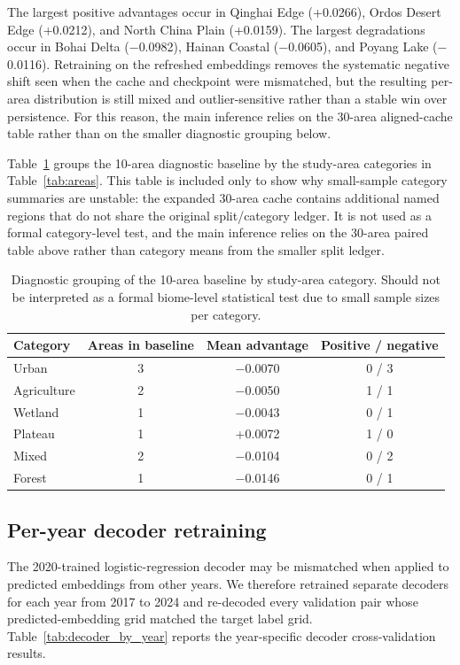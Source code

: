 \documentclass{article}
\begin{document}
The largest positive advantages occur in Qinghai Edge (+0.0266), Ordos Desert Edge (+0.0212), and North China Plain (+0.0159). The largest degradations occur in Bohai Delta ($-$0.0982), Hainan Coastal ($-$0.0605), and Poyang Lake ($-$0.0116). Retraining on the refreshed embeddings removes the systematic negative shift seen when the cache and checkpoint were mismatched, but the resulting per-area distribution is still mixed and outlier-sensitive rather than a stable win over persistence. For this reason, the main inference relies on the 30-area aligned-cache table rather than on the smaller diagnostic grouping below.


Table~\ref{tab:category_diagnostic} groups the 10-area diagnostic baseline by the study-area categories in Table~\ref{tab:areas}. This table is included only to show why small-sample category summaries are unstable: the expanded 30-area cache contains additional named regions that do not share the original split/category ledger. It is not used as a formal category-level test, and the main inference relies on the 30-area paired table above rather than category means from the smaller split ledger.

\begin{table}[htbp]
\centering
\caption{Diagnostic grouping of the 10-area baseline by study-area category. Should not be interpreted as a formal biome-level statistical test due to small sample sizes per category.}
\label{tab:category_diagnostic}
\small
\begin{tabular}{lccc}
\toprule
Category & Areas in baseline & Mean advantage & Positive / negative \\
\midrule
Urban & 3 & $-$0.0070 & 0 / 3 \\
Agriculture & 2 & $-$0.0050 & 1 / 1 \\
Wetland & 1 & $-$0.0043 & 0 / 1 \\
Plateau & 1 & +0.0072 & 1 / 0 \\
Mixed & 2 & $-$0.0104 & 0 / 2 \\
Forest & 1 & $-$0.0146 & 0 / 1 \\
\bottomrule
\end{tabular}
\end{table}

\subsection{Per-year decoder retraining}
\label{sec:peryear_decoder}

The 2020-trained logistic-regression decoder may be mismatched when applied to predicted embeddings from other years. We therefore retrained separate decoders for each year from 2017 to 2024 and re-decoded every validation pair whose predicted-embedding grid matched the target label grid. Table~\ref{tab:decoder_by_year} reports the year-specific decoder cross-validation results.
\end{document}

